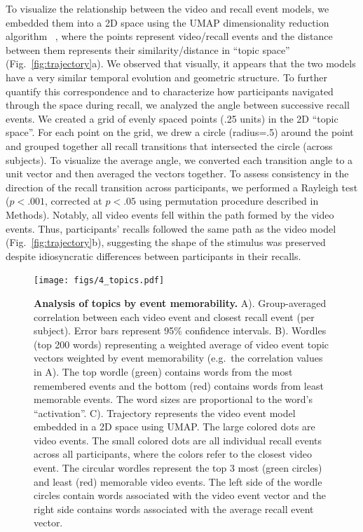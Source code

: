 \documentclass{article}
\begin{document}
To visualize the relationship between the video and recall event models, we embedded them into a 2D space using the UMAP dimensionality reduction algorithm ~\citep{McInHeal18}, where the points represent video/recall events and the distance between them represents their similarity/distance in ``topic space'' (Fig.~\ref{fig:trajectory}a).  We observed that visually, it appears that the two models have a very similar temporal evolution and geometric structure. To further quantify this correspondence and to characterize how participants navigated through the space during recall, we analyzed the angle between successive recall events. We created a grid of evenly spaced points (.25 units) in the 2D ``topic space''. For each point on the grid, we drew a circle (radius=.5) around the point and grouped together all recall transitions that intersected the circle (across subjects). To visualize the average angle, we converted each transition angle to a unit vector and then averaged the vectors together. To assess consistency in the direction of the recall transition across participants, we performed a Rayleigh test ($p<.001$, corrected at $p<.05$ using permutation procedure described in Methods). Notably, all video events fell within the path formed by the video events.  Thus, participants' recalls followed the same path as the video model (Fig.~\ref{fig:trajectory}b), suggesting the shape of the stimulus was preserved despite idiosyncratic differences between participants in their recalls.


\begin{figure}[t!]
\centering
\texttt{[image: figs/4\_topics.pdf]}
\caption{\small \textbf{Analysis of topics by event memorability.} A). Group-averaged correlation between each video event and closest recall event (per subject). Error bars represent 95\% confidence intervals. B). Wordles (top 200 words) representing a weighted average of video event topic vectors weighted by event memorability (e.g.\ the correlation values in A). The top wordle (green) contains words from the most remembered events and the bottom (red) contains words from least memorable events. The word sizes are proportional to the word's ``activation''. C). Trajectory represents the video event model embedded in a 2D space using UMAP. The large colored dots are video events. The small colored dots are all individual recall events across all participants, where the colors refer to the closest video event. The circular wordles represent the top 3 most (green circles) and least (red) memorable video events.  The left side of the wordle circles contain words associated with the video event vector and the right side contains words associated with the average recall event vector.}
\label{fig:topics}
\end{figure}
\end{document}

